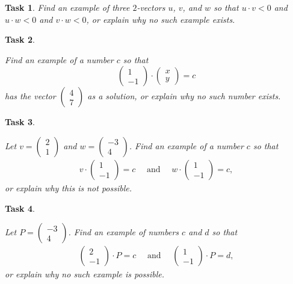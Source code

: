 \documentclass[10pt,]{book}
\theoremstyle{plain}
\numberwithin{equation}{section}
\newtheorem{task}{Task}[chapter]
\begin{document}
\begin{task}
\label{task-16}
Find an example of three \(2\)-vectors \(u\), \(v\),
        and \(w\) so that \( u \cdot v < 0\) and \(u\cdot w < 0 \)
        and \(v \cdot w < 0\), or explain why no such example exists.
      \end{task}
\begin{task}
\label{task-17}

        Find an example of a number \(c\) so that \[
        \begin{pmatrix} 1 \\ -1 \end{pmatrix} \cdot \begin{pmatrix} x \\ y
          \end{pmatrix} = c
        \] has the vector \(\left(\begin{smallmatrix}4 \\ 7 \end{smallmatrix}\right)\)
        as a solution, or explain why no such number exists.
      \end{task}
\begin{task}
\label{task-18}

        Let \(v = \left(\begin{smallmatrix}2\\1\end{smallmatrix}\right)\) and
        \(w=\left(\begin{smallmatrix}-3\\4\end{smallmatrix}\right)\). Find
        an example of a number \(c\) so that \begin{gather*}
v \cdot \begin{pmatrix}1\\-1\end{pmatrix} = c \quad\text{ and }
        \quad w \cdot \begin{pmatrix}1\\-1\end{pmatrix} = c,
\end{gather*}
        or explain why this is not possible.
      \end{task}
\begin{task}
\label{task-19}

        Let \(P = \left(\begin{smallmatrix}-3\\4\end{smallmatrix}\right)\).
        Find an example of numbers \(c\) and \(d\) so that \begin{gather*}
\begin{pmatrix} 2\\-1\end{pmatrix}\cdot P = c \quad\text{ and }
        \quad \begin{pmatrix} 1\\-1\end{pmatrix}\cdot P = d,
\end{gather*}
        or explain why no such example is possible.
      \end{task}
\end{document}
